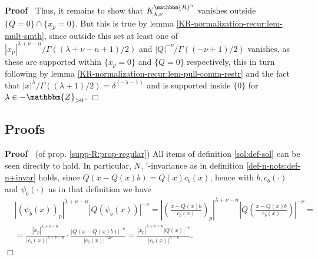 \documentclass{article}
\newcommand{\um}{-}
\newenvironment{proof}{\noindent\textbf{Proof\ }}{\hspace*{\fill}$\Box$\medskip}
\numberwithin{definition}{section}
\numberwithin{lemma}{section}
\numberwithin{proposition}{section}
{\theorembodyfont{\rmfamily}\newtheorem{remark}{Remark}
\numberwithin{remark}{section}
}
\begin{document}
\begin{proof}
  Thus, it remains to show that $K_{\lambda, \nu}^{\mathbbm{R}^n}$ vanishes
  outside $\{ Q = 0 \} \cap \{ x_p = 0 \}$. But this is true by lemma
  \ref{KR-normalization-recur:lem-mult-smth}, since outside this set at least
  one of $| x_p |^{\lambda + \nu - n} / \Gamma ( ( \lambda + \nu - n + 1) /
  2)$ and $| Q |^{- \nu} / \Gamma ( ( \um \nu + 1) / 2)$ vanishes, as these
  are supported within $\{ x_p = 0 \}$ and $\{ Q = 0 \}$ respectively, this in
  turn following by lemma \ref{KR-normalization-recur:lem-pull-comm-restr} and
  the fact that $| x |^{\lambda} / \Gamma ( ( \lambda + 1) / 2) = \delta^{( -
  \lambda - 1)}$ and is supported inside $\{ 0 \}$ for $\lambda \in
  -\mathbbm{Z}_{> 0}$.
\end{proof}

\subsection{Proofs}

\begin{proof}
  (of prop. \ref{supp-R:prop-regular}) All items of definition
  \ref{sol:def-sol} can be seen directly to hold. In particular,
  $N_+'$-invariance as in definition \ref{def-n-nots:def-n+invar} holds, since
  $Q ( x - Q ( x) b) = Q ( x) c_b ( x)$, hence with $b, c_b ( \cdot)$ and
  $\psi_b ( \cdot)$ as in that definition we have
  \begin{eqnarray}
    & | ( \psi_b ( x))_p |^{\lambda + \nu - n} | Q ( \psi_b ( x)) |^{- \nu} =
    \left| \left( \frac{x - Q ( x) b}{c_b ( x)} \right)_p \right|^{\lambda +
    \nu - n} \left| Q \left( \frac{x - Q ( x) b}{c_b ( x)} \right) \right|^{-
    \nu} = &  \nonumber\\
    & = \frac{| x_p |^{\lambda + \nu - n}}{| c_b ( x) |^{\lambda + \nu - n}}
    \cdot \frac{| Q ( x - Q ( x) b) |^{- \nu}}{| c_b ( x) |^{- 2 \nu}} =
    \frac{| x_p |^{\lambda + \nu - n} | Q ( x) |^{- \nu}}{| c_b ( x)
    |^{\lambda - n}} . &  \nonumber
  \end{eqnarray}
\end{proof}
\end{document}
